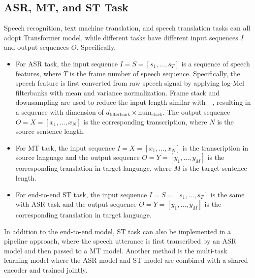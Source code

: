 \documentclass[letterpaper]{article} %
\begin{document}
\subsection{ASR, MT, and ST Task}
Speech recognition, text machine translation, and speech translation tasks can all adopt Transformer model, while different tasks have different input sequences $\mathbf{\mathit{I}}$ and output sequences $\mathbf{\mathit{O}}$. Specifically,
\begin{itemize}
	\item For ASR task, the input sequence $\mathbf{\mathit{I}}=\mathbf{\mathit{S}}=[s_1,\dots,s_T]$ is a sequence of speech features, where $T$ is the frame number of speech sequence. Specifically, the speech feature is first converted from raw speech signal by applying log-Mel filterbanks with mean and variance normalization. Frame stack and downsampling are used  to reduce the input length similar with~\citeauthor{sak2015fast}~, resulting in a sequence with dimension of $d_{\textrm{filterbank}} \times \textrm{num}_{\textrm{stack}}$.
	The output sequence $\mathbf{\mathit{O}}=\mathbf{\mathit{X}}=[x_1,\dots,x_N]$ is the corresponding transcription, where $N$ is the source sentence length.
	\item For  MT task, the input sequence $\mathbf{\mathit{I}}=\mathbf{\mathit{X}}=[x_1,\dots,x_N]$ is  the transcription in source language and the output sequence $\mathbf{\mathit{O}}=\mathbf{\mathit{Y}}=[y_1,\dots,y_M]$ is the corresponding translation in target language, where $M$ is the target sentence length.
	\item For end-to-end ST task, the input sequence $\mathbf{\mathit{I}}=\mathbf{\mathit{S}}=[s_1,\dots,s_T]$ is the same with ASR task and the output sequence $\mathbf{\mathit{O}}=\mathbf{\mathit{Y}}=[y_1,\dots,y_M]$ is the corresponding translation in target language.
\end{itemize}

In addition to the end-to-end model, ST task can also be implemented in a pipeline approach, where the speech utterance is first transcribed by an ASR model and then passed to a MT model. Another method is the multi-task learning model where the ASR model and ST model are combined with a shared encoder and trained jointly.
\end{document}
